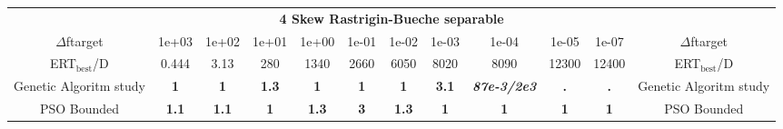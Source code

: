 \begin{tabular}{cccccccccccc}
 & \multicolumn{10}{c}{{\normalsize \textbf{4 Skew Rastrigin-Bueche separable}}}\\
$\Delta$ftarget& 1e+03& 1e+02& 1e+01& 1e+00& 1e-01& 1e-02& 1e-03& 1e-04& 1e-05& 1e-07 & $\Delta$ftarget \\
ERT$_{\textrm{best}}$/D& 0.444& 3.13& 280& 1340& 2660& 6050& 8020& 8090& 12300& 12400 & ERT$_{\textrm{best}}$/D \\
\hline
Genetic Algoritm study & \textbf{1} & \textbf{1} & \textbf{1.3} & \textbf{1} & \textbf{1} & \textbf{1} & \textbf{3.1} & \textbf{\textit{87e-3}\textit{/2e3}} & \textbf{.} & \textbf{.} & Genetic Algoritm study \cite{add_an_entry_for_Genetic Algoritm study_in_bbob.bib}\\
PSO Bounded & \textbf{1.1} & \textbf{1.1} & \textbf{1} & \textbf{1.3} & \textbf{3} & \textbf{1.3} & \textbf{1} & \textbf{1} & \textbf{1} & \textbf{1} & PSO Bounded \cite{add_an_entry_for_PSO Bounded_in_bbob.bib}
\end{tabular}
